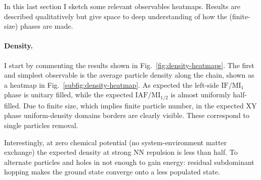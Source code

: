 In this last section I sketch some relevant observables heatmaps. Results are described qualitatively but give space to deep understanding of how the (finite-size) phases are made.

\paragraph{Density.} I start by commenting the results shown in Fig.~\ref{fig:density-heatmaps}. The first and simplest observable is the average particle density along the chain, shown as a heatmap in Fig.~\ref{subfig:density-heatmap}. As expected the left-side $\mathrm{IF}/\mathrm{MI}_1$ phase is unitary filled, while the expected $\mathrm{IAF}/\mathrm{MI}_{1/2}$ is almost uniformly half-filled. Due to finite size, which implies finite particle number, in the expected $\mathrm{XY}$ phase uniform-density domains borders are clearly visible. These correspond to single particles removal.

Interestingly, at zero chemical potential (no system-environment matter exchange) the expected density at strong NN repulsion is less than half. To alternate particles and holes in not enough to gain energy: residual subdominant hopping makes the ground state converge onto a less populated state.

